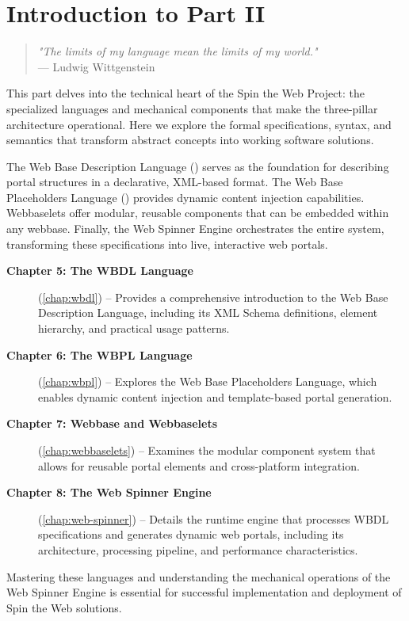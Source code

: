 
\chapter*{Introduction to Part II}
\label{part:languages}

\begin{quote}
\textit{"The limits of my language mean the limits of my world."} \\
— Ludwig Wittgenstein
\end{quote}

This part delves into the technical heart of the Spin the Web Project: the specialized languages and mechanical components that make the three-pillar architecture operational. Here we explore the formal specifications, syntax, and semantics that transform abstract concepts into working software solutions.

The Web Base Description Language (\wbdl{}) serves as the foundation for describing portal structures in a declarative, XML-based format. The Web Base Placeholders Language (\wbpl{}) provides dynamic content injection capabilities. Webbaselets offer modular, reusable components that can be embedded within any webbase. Finally, the Web Spinner Engine orchestrates the entire system, transforming these specifications into live, interactive web portals.

\begin{description}
\item[\textbf{Chapter 5: The WBDL Language}] (\cref{chap:wbdl}) -- Provides a comprehensive introduction to the Web Base Description Language, including its XML Schema definitions, element hierarchy, and practical usage patterns.

\item[\textbf{Chapter 6: The WBPL Language}] (\cref{chap:wbpl}) -- Explores the Web Base Placeholders Language, which enables dynamic content injection and template-based portal generation.

\item[\textbf{Chapter 7: Webbase and Webbaselets}] (\cref{chap:webbaselets}) -- Examines the modular component system that allows for reusable portal elements and cross-platform integration.

\item[\textbf{Chapter 8: The Web Spinner Engine}] (\cref{chap:web-spinner}) -- Details the runtime engine that processes WBDL specifications and generates dynamic web portals, including its architecture, processing pipeline, and performance characteristics.
\end{description}

Mastering these languages and understanding the mechanical operations of the Web Spinner Engine is essential for successful implementation and deployment of Spin the Web solutions.
